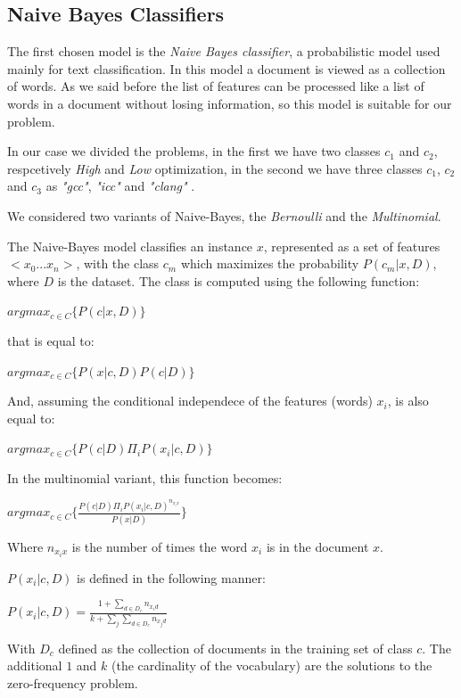 \documentclass[12pt]{article}
\begin{document}
\subsection{Naive Bayes Classifiers}
The first chosen model is the {\em Naive Bayes classifier}, a probabilistic model used mainly for text classification. In this model a document is viewed as a collection of words. As we said before the list of features can be processed like a list of words in a document without losing information, so this model is suitable for our problem.

In our case we divided the problems, in the first we have two classes $c_1$ and $c_2$, respcetively {\em High} and {\em Low} optimization, in the second we have three classes $c_1$, $c_2$ and $c_3$ as {\em "gcc"}, {\em "icc"} and {\em "clang"} .

We considered two variants of Naive-Bayes, the {\em Bernoulli} and the {\em Multinomial}.

The Naive-Bayes model classifies an instance $x$, represented as a set of features $<x_0 ... x_n>$, with the class $c_m$ which maximizes the probability $P (c_m | x, D)$, where $D$ is the dataset.
The class is computed using the following function:

\bigskip
$argmax_{c \in C}\{P (c | x, D)\}$
\bigskip

that is equal to:

\bigskip
$argmax_{c \in C}\{P (x | c, D)P (c | D)\}$
\bigskip

And, assuming the conditional independece of the features (words) $x_i$, is also equal to:

\bigskip
$argmax_{c \in C}\{P (c | D) \Pi_i P (x_i | c,D)\}$
\bigskip

In the multinomial variant, this function becomes:

\bigskip
$argmax_{c \in C}\{ \displaystyle \frac{P(c | D) \Pi_i P(x_i | c, D)^{n_{x_i x}}}{P(x | D)}\}$
\bigskip

Where $n_{x_i x}$ is the number of times the word $x_i$ is in the document $x$.

$P(x_i|c, D)$ is defined in the following manner:

\bigskip
$P(x_i|c, D) = \displaystyle \frac{1 + \sum_{d \in D_c} n_{x_i d}}{k + \sum_{j} \sum_{d \in D_c} n_{x_j d}}$
\bigskip

With $D_c$ defined as the collection of documents in the training set of class $c$.
The additional $1$ and $k$ (the cardinality of the vocabulary) are the solutions to the zero-frequency problem.
\end{document}
